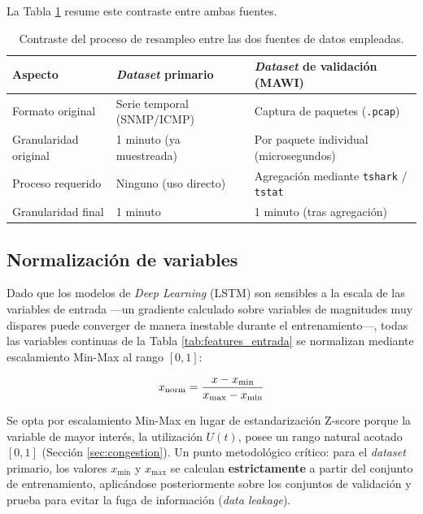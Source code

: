 \documentclass[12pt]{report}
\begin{document}
La Tabla \ref{tab:resampleo_fuentes} resume este contraste entre ambas fuentes.

\begin{table}[H]
    \centering
    \begin{tabular}{|l|p{4.3cm}|p{4.3cm}|}
        \hline
        \textbf{Aspecto} & \textbf{\textit{Dataset} primario} & \textbf{\textit{Dataset} de validación (MAWI)} \\
        \hline
        Formato original & Serie temporal (SNMP/ICMP) & Captura de paquetes (\texttt{.pcap}) \\
        \hline
        Granularidad original & 1 minuto (ya muestreada) & Por paquete individual (microsegundos) \\
        \hline
        Proceso requerido & Ninguno (uso directo) & Agregación mediante \texttt{tshark} / \texttt{tstat} \\
        \hline
        Granularidad final & 1 minuto & 1 minuto (tras agregación) \\
        \hline
    \end{tabular}
    \caption{Contraste del proceso de resampleo entre las dos fuentes de datos empleadas.}
    \label{tab:resampleo_fuentes}
\end{table}

\subsection*{Normalización de variables}

Dado que los modelos de \textit{Deep Learning} (LSTM) son sensibles a la escala de las variables de entrada ---un gradiente calculado sobre variables de magnitudes muy dispares puede converger de manera inestable durante el entrenamiento---, todas las variables continuas de la Tabla \ref{tab:features_entrada} se normalizan mediante escalamiento Min-Max al rango $[0,1]$:

\begin{equation}
    x_{\mbox{\scriptsize norm}} = \frac{x - x_{\min}}{x_{\max} - x_{\min}}
    \label{eq:minmax}
\end{equation}

Se opta por escalamiento Min-Max en lugar de estandarización Z-score porque la variable de mayor interés, la utilización $U(t)$, posee un rango natural acotado $[0,1]$ (Sección \ref{sec:congestion}). Un punto metodológico crítico: para el \textit{dataset} primario, los valores $x_{\min}$ y $x_{\max}$ se calculan \textbf{estrictamente} a partir del conjunto de entrenamiento, aplicándose posteriormente sobre los conjuntos de validación y prueba para evitar la fuga de información (\textit{data leakage}). 
\end{document}
